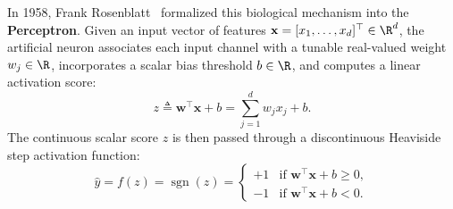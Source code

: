 In 1958, Frank Rosenblatt~\cite{rosenblatt1958perceptron} formalized this biological mechanism into the \textbf{Perceptron}. Given an input vector of features $\mathbf{x} = [x_1, \dots, x_d]^\top \in \R^d$, the artificial neuron associates each input channel with a tunable real-valued weight $w_j \in \R$, incorporates a scalar bias threshold $b \in \R$, and computes a linear activation score:
\begin{equation}
z \triangleq \mathbf{w}^\top \mathbf{x} + b = \sum_{j=1}^d w_j x_j + b.
\label{eq:perceptron_preactivation}
\end{equation}
The continuous scalar score $z$ is then passed through a discontinuous Heaviside step activation function:
\begin{equation}
\hat{y} = f(z) = \operatorname{sgn}(z) = \begin{cases} +1 & \text{if } \mathbf{w}^\top \mathbf{x} + b \ge 0, \\ -1 & \text{if } \mathbf{w}^\top \mathbf{x} + b < 0. \end{cases}
\label{eq:perceptron_activation}
\end{equation}

